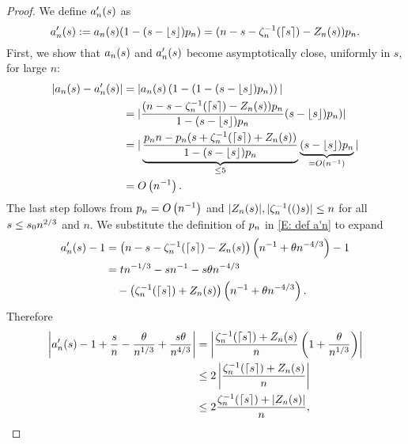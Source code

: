 \begin{proof} \label{P: limit An}
	We define $a'_n(s)$ as
	\begin{equation} \label{E: def a'n}
		a'_n(s) := a_n(s) (1 - (s - \lfloor s\rfloor)p_n) = (n - s - \zeta^{-1}_n(\lceil s\rceil) - Z_n(s)) p_n.
	\end{equation}
	First, we show that $a_n(s)$ and $a'_n(s)$ become asymptotically close, uniformly in $s$, for large $n$:
	\begin{equation} \label{E: convergence an amn}
	\begin{aligned}
	|a_n(s) - a'_n(s)|
	&= |a_n(s)\left( 1-(1 - (s - \lfloor s\rfloor)p_n) \right)| \\
	&= | \frac{(n - s - \zeta^{-1}_n(\lceil s\rceil) - Z_n(s))p_n}{1-(s - \lfloor s\rfloor)p_n} (s - \lfloor s\rfloor)p_n) | \\
	&= |\underbrace{\frac{p_n n - p_n(s + \zeta^{-1}_n(\lceil s\rceil) + Z_n(s))}{1-(s - \lfloor s\rfloor)p_n}}_{\leq 5} 
		\underbrace{(s - \lfloor s\rfloor)p_n}_{=O\left(n^{-1}\right)} |\\
	&= O\left(n^{-1}\right).
	\end{aligned}
	\end{equation}
	The last step follows from $p_n = O\left(n^{-1}\right)$ and $|Z_n(s)|, |\zeta^{-1}_n(()s)| \leq n$ for all $s \leq s_0n^{2 / 3}$ and $n$.
	We substitute the definition of $p_n$ in \eqref{E: def a'n} to expand
	\begin{align*}
	a'_n(s) - 1 
	&= \left( n - s - \zeta^{-1}_n(\lceil s\rceil) - Z_n(s) \right) \left( n^{-1} + \theta n^{-4 / 3} \right) - 1 \\
	&= tn^{-1 / 3} - sn^{-1} - s\theta n^{-4 / 3} \\
	&\quad - \left( \zeta^{-1}_n(\lceil s\rceil) + Z_n(s) \right) \left( n^{-1} + \theta n^{-4 / 3} \right).
	\end{align*}
	Therefore
	\begin{equation} \label{E: an zeta Z / n} 
	\begin{aligned}
	\left| a'_n(s) - 1 + \frac{s}{n} - \frac{\theta}{n^{1 / 3}} + \frac{s\theta}{n^{4 / 3}} \right|
	&= \left| \frac{\zeta^{-1}_n(\lceil s\rceil) + Z_n(s)}{n} \left( 1 + \frac{\theta}{n^{1 / 3}} \right) \right| \\
	&\leq 2 \left| \frac{\zeta^{-1}_n(\lceil s\rceil) + Z_n(s)}{n} \right| \\
	&\leq 2 \frac{\zeta^{-1}_n(\lceil s\rceil) + |Z_n(s)|}{n} ,  
	\end{aligned}
	\end{equation}

\end{proof}
